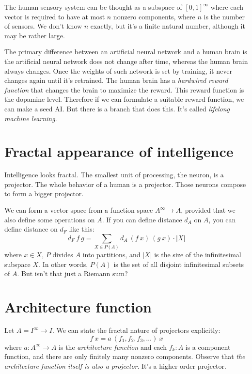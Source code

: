 The human sensory system can be thought as a subspace
of \([0,1]^\infty\) where each vector
is required to have at most \(n\) nonzero components,
where \(n\) is the number of sensors.
We don't know \(n\) exactly,
but it's a finite natural number,
although it may be rather large.

The primary difference between an artificial neural network and a human brain
is the artificial neural network does not change after time,
whereas the human brain always changes.
Once the weights of such network is set by training,
it never changes again until it's retrained.
The human brain has a \emph{hardwired reward function}
that changes the brain to maximize the reward.
This reward function is the dopamine level.
Therefore if we can formulate a suitable reward function,
we can make a seed AI.
But there is a branch that does this.
It's called \emph{lifelong machine learning}.

\section{Fractal appearance of intelligence}

Intelligence looks fractal.
The smallest unit of processing, the neuron, is a projector.
The whole behavior of a human is a projector.
Those neurons compose to form a bigger projector.

We can form a vector space from a function space \(A^\infty \to A\),
provided that we also define some operations on \(A\).
If you can define distance \(d_A\) on \(A\),
you can define distance on \(d_F\) like this:
\[
    d_F~f~g = \sum_{X \in P(A)} d_A~(f~x)~(g~x) \cdot |X|
\]
where \(x \in X\), \(P\) divides \(A\) into partitions,
and \(|X|\) is the size of the infinitesimal subspace \(X\).
In other words, \(P(A)\) is the set of all disjoint infinitesimal subsets of \(A\).
But isn't that just a Riemann sum?

\section{Architecture function}

Let \(A = I^\infty \to I\).
We can state the fractal nature of projectors explicitly:
\[
    f~x = a~(f_1,f_2,f_3,\ldots)~x
\]
where \(a : A^\infty \to A\) is the \emph{architecture function}
and each \(f_k : A\) is a component function,
and there are only finitely many nonzero components.
Observe that \emph{the architecture function itself is also a projector}.
It's a higher-order projector.

